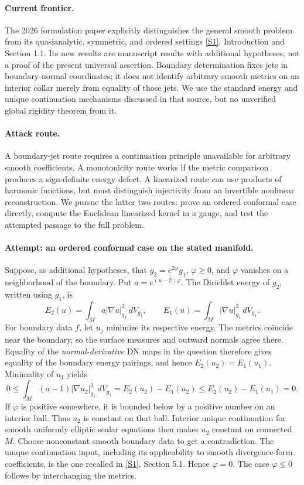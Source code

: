 \documentclass[11pt,a4paper]{article}
\newcommand{\sref}[2]{\hyperlink{source:#1:#2}{[S#2]}}
\numberwithin{equation}{section}
\begin{document}
\paragraph{Current frontier.}
The 2026 formulation paper explicitly distinguishes the general smooth
problem from its quasianalytic, symmetric, and ordered settings
\sref{statement}{1}, Introduction and Section 1.1. Its new results are manuscript
results with additional hypotheses, not a proof of the present universal
assertion. Boundary determination fixes jets in boundary-normal coordinates;
it does not identify arbitrary smooth metrics on an interior collar merely
from equality of those jets. We use the standard energy and unique
continuation mechanisms discussed in that source, but no unverified global
rigidity theorem from it.

\paragraph{Attack route.}
A boundary-jet route requires a continuation principle unavailable for
arbitrary smooth coefficients. A monotonicity route works if the metric
comparison produces a sign-definite energy defect. A linearized route can
use products of harmonic functions, but must distinguish injectivity from
an invertible nonlinear reconstruction. We pursue the latter two routes:
prove an ordered conformal case directly, compute the Euclidean linearized
kernel in a gauge, and test the attempted passage to the full problem.

\paragraph{Attempt: an ordered conformal case on the stated manifold.}
Suppose, as additional hypotheses, that
$g_2=e^{2\varphi}g_1$, $\varphi\ge0$, and $\varphi$ vanishes on a
neighborhood of the boundary. Put $a=e^{(n-2)\varphi}$.
The Dirichlet energy of $g_2$, written using $g_1$, is
\[
 E_2(u)=\int_M a|\nabla u|_{g_1}^2\,dV_{g_1},
 \qquad E_1(u)=\int_M|\nabla u|_{g_1}^2\,dV_{g_1}.
\]
For boundary data $f$, let $u_j$ minimize its respective energy. The metrics
coincide near the boundary, so the surface measures and outward normals
agree there. Equality of the \emph{normal-derivative} DN maps in the question
therefore gives equality of the boundary energy pairings, and hence
$E_2(u_2)=E_1(u_1)$. Minimality of $u_1$ yields
\begin{equation}\label{eq176-monotone}
 0\le\int_M(a-1)|\nabla u_2|_{g_1}^2\,dV_{g_1}
     =E_2(u_2)-E_1(u_2)
     \le E_2(u_2)-E_1(u_1)=0.
\end{equation}
If $\varphi$ is positive somewhere, it is bounded below by a positive
number on an interior ball. Thus $u_2$ is constant on that ball. Interior
unique continuation for smooth uniformly elliptic scalar equations then
makes $u_2$ constant on connected $M$. Choose nonconstant smooth boundary
data to get a contradiction. The unique continuation input, including its
applicability to smooth divergence-form coefficients, is the one recalled
in \sref{statement}{1}, Section 5.1. Hence $\varphi=0$.
The case $\varphi\le0$ follows by interchanging the metrics.
\end{document}
